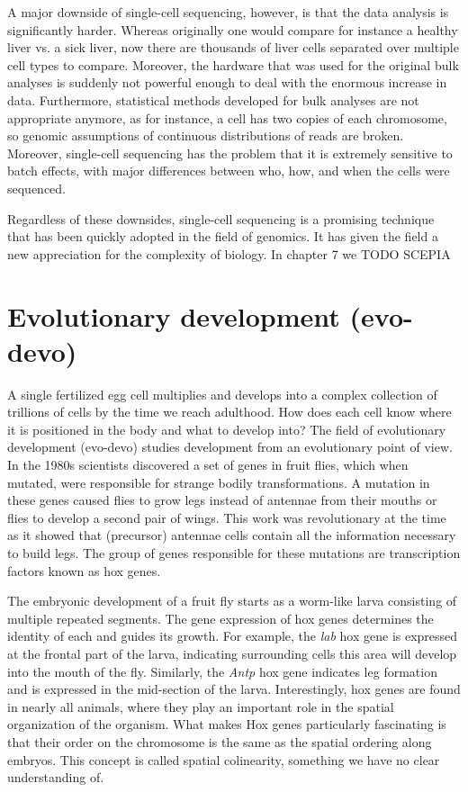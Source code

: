 A major downside of single-cell sequencing, however, is that the data analysis is significantly harder. Whereas originally one would compare for instance a healthy liver vs. a sick liver, now there are thousands of liver cells separated over multiple cell types to compare. Moreover, the hardware that was used for the original bulk analyses is suddenly not powerful enough to deal with the enormous increase in data. Furthermore, statistical methods developed for bulk analyses are not appropriate anymore, as for instance, a cell has two copies of each chromosome, so genomic assumptions of continuous distributions of reads are broken. Moreover, single-cell sequencing has the problem that it is extremely sensitive to batch effects, with major differences between who, how, and when the cells were sequenced.

Regardless of these downsides, single-cell sequencing is a promising technique that has been quickly adopted in the field of genomics. It has given the field a new appreciation for the complexity of biology. In chapter 7 we TODO SCEPIA

\section{Evolutionary development (evo-devo)}

A single fertilized egg cell multiplies and develops into a complex collection of trillions of cells by the time we reach adulthood. How does each cell know where it is positioned in the body and what to develop into? The field of evolutionary development (evo-devo) studies development from an evolutionary point of view. In the 1980s scientists discovered a set of genes in fruit flies, which when mutated, were responsible for strange bodily transformations. A mutation in these genes caused flies to grow legs instead of antennae from their mouths\cite{Schneuwly1987} or flies to develop a second pair of wings\cite{Weatherbee1998}. This work was revolutionary at the time as it showed that (precursor) antennae cells contain all the information necessary to build legs. The group of genes responsible for these mutations are transcription factors known as hox genes.

The embryonic development of a fruit fly starts as a worm-like larva consisting of multiple repeated segments. The gene expression of hox genes determines the identity of each  and guides its growth. For example, the \textit{lab} hox gene is expressed at the frontal part of the larva, indicating surrounding cells this area will develop into the mouth of the fly\cite{Hughes2002}. Similarly, the \textit{Antp} hox gene indicates leg formation and is expressed in the mid-section of the larva. Interestingly, hox genes are found in nearly all animals, where they play an important role in the spatial organization of the organism. What makes Hox genes particularly fascinating is that their order on the chromosome is the same as the spatial ordering along embryos. This concept is called spatial colinearity, something we have no clear understanding of\cite{Gaunt2015}.

